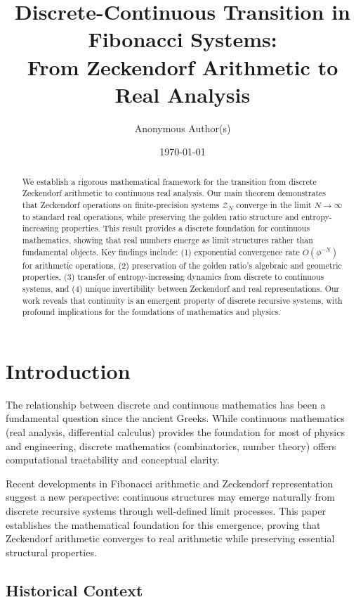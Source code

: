 \documentclass[12pt]{article}
\title{Discrete-Continuous Transition in Fibonacci Systems: \\From Zeckendorf Arithmetic to Real Analysis}
\author{Anonymous Author(s)}
\date{\today}
\theoremstyle{plain}
\theoremstyle{definition}
\begin{document}
\maketitle

\begin{abstract}
We establish a rigorous mathematical framework for the transition from discrete Zeckendorf arithmetic to continuous real analysis. Our main theorem demonstrates that Zeckendorf operations on finite-precision systems $\mathcal{Z}_N$ converge in the limit $N \to \infty$ to standard real operations, while preserving the golden ratio structure and entropy-increasing properties. This result provides a discrete foundation for continuous mathematics, showing that real numbers emerge as limit structures rather than fundamental objects. Key findings include: (1) exponential convergence rate $O(\phi^{-N})$ for arithmetic operations, (2) preservation of the golden ratio's algebraic and geometric properties, (3) transfer of entropy-increasing dynamics from discrete to continuous systems, and (4) unique invertibility between Zeckendorf and real representations. Our work reveals that continuity is an emergent property of discrete recursive systems, with profound implications for the foundations of mathematics and physics.
\end{abstract}

\section{Introduction}

The relationship between discrete and continuous mathematics has been a fundamental question since the ancient Greeks. While continuous mathematics (real analysis, differential calculus) provides the foundation for most of physics and engineering, discrete mathematics (combinatorics, number theory) offers computational tractability and conceptual clarity.

Recent developments in Fibonacci arithmetic and Zeckendorf representation suggest a new perspective: continuous structures may emerge naturally from discrete recursive systems through well-defined limit processes. This paper establishes the mathematical foundation for this emergence, proving that Zeckendorf arithmetic converges to real arithmetic while preserving essential structural properties.

\subsection{Historical Context}
\end{document}
